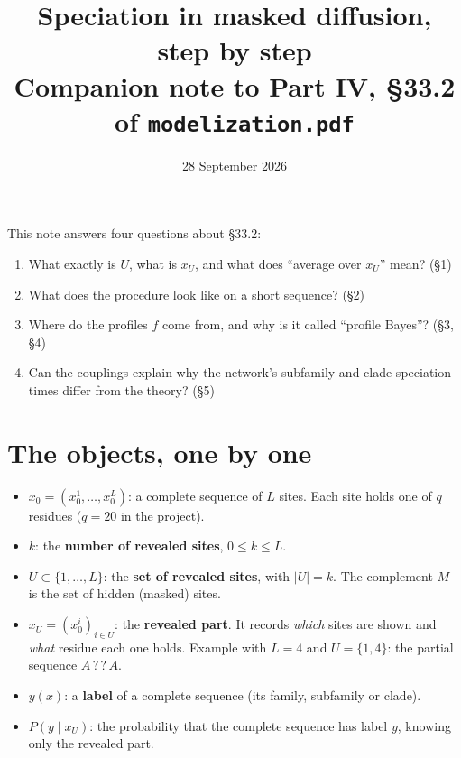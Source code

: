 \documentclass[11pt,a4paper]{article}
\title{\textbf{Speciation in masked diffusion, step by step}\\[3pt]
\large Companion note to Part IV, \S33.2 of \texttt{modelization.pdf}}
\date{28 September 2026}
\begin{document}
\maketitle

\noindent This note answers four questions about \S33.2:
\begin{enumerate}[nosep]
\item What exactly is $U$, what is $x_U$, and what does ``average over $x_U$'' mean? (\S1)
\item What does the procedure look like on a short sequence? (\S2)
\item Where do the profiles $f$ come from, and why is it called ``profile Bayes''? (\S3, \S4)
\item Can the couplings explain why the network's subfamily and clade speciation times differ from the theory? (\S5)
\end{enumerate}

\section{The objects, one by one}
\begin{itemize}[nosep]
\item $x_0=(x_0^1,\dots,x_0^L)$: a complete sequence of $L$ sites. Each site holds one of $q$ residues ($q=20$ in the
project).
\item $k$: the \textbf{number of revealed sites}, $0\le k\le L$.
\item $U\subset\{1,\dots,L\}$: the \textbf{set of revealed sites}, with $|U|=k$. The complement $M$ is the set of
hidden (masked) sites.
\item $x_U=(x_0^i)_{i\in U}$: the \textbf{revealed part}. It records \emph{which} sites are shown and \emph{what}
residue each one holds. Example with $L=4$ and $U=\{1,4\}$: the partial sequence $A\,?\,?\,A$.
\item $y(x)$: a \textbf{label} of a complete sequence (its family, subfamily or clade).
\item $P(y\mid x_U)$: the probability that the complete sequence has label $y$, knowing only the revealed part.
\end{itemize}
\end{document}
